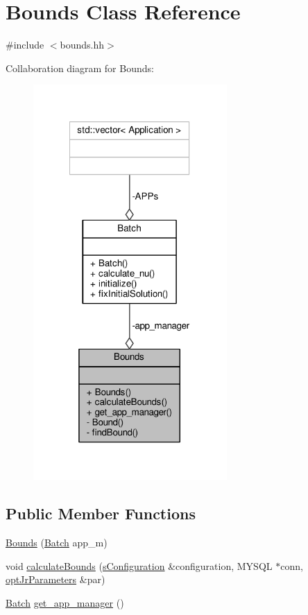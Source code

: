 \hypertarget{classBounds}{\section{Bounds Class Reference}
\label{classBounds}
}


{\ttfamily \#include $<$bounds.\-hh$>$}



Collaboration diagram for Bounds\-:
\nopagebreak
\begin{figure}[H]
\begin{center}
\leavevmode
\includegraphics[width=209pt]{classBounds__coll__graph}
\end{center}
\end{figure}
\subsection*{Public Member Functions}
\begin{DoxyCompactItemize}
\item 
\hyperlink{classBounds_a57a9894ee450eb885a83e884b5fb79e7}{Bounds} (\hyperlink{classBatch}{Batch} app\-\_\-m)
\item 
void \hyperlink{classBounds_aefc7e0bd2cd1c5850a903aabe0351dbe}{calculate\-Bounds} (\hyperlink{readConfigurationFile_8hh_ab8f35b1da3261263c5e9c0e7c8921f5c}{s\-Configuration} \&configuration, M\-Y\-S\-Q\-L $\ast$conn, \hyperlink{classoptJrParameters}{opt\-Jr\-Parameters} \&par)
\item 
\hyperlink{classBatch}{Batch} \hyperlink{classBounds_aefebbfe17ca3a7d6a0f6cbf4a0bf2782}{get\-\_\-app\-\_\-manager} ()
\end{DoxyCompactItemize}
